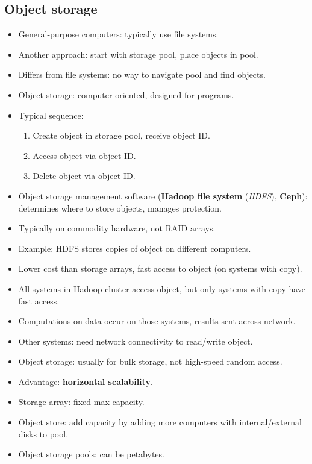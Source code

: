 \subsection{Object storage}
\begin{itemize}
    \item General-purpose computers: typically use file systems.
    \item Another approach: start with storage pool, place objects in pool.
    \item Differs from file systems: no way to navigate pool and find objects.
    \item Object storage: computer-oriented, designed for programs.
    \item Typical sequence:
    \begin{enumerate}
        \item Create object in storage pool, receive object ID.
        \item Access object via object ID.
        \item Delete object via object ID.
    \end{enumerate}
    \item Object storage management software (\textbf{Hadoop file system} (\textit{HDFS}), \textbf{Ceph}): determines where to store objects, manages protection.
    \item Typically on commodity hardware, not RAID arrays.
    \item Example: HDFS stores copies of object on different computers.
    \item Lower cost than storage arrays, fast access to object (on systems with copy).
    \item All systems in Hadoop cluster access object, but only systems with copy have fast access.
    \item Computations on data occur on those systems, results sent across network.
    \item Other systems: need network connectivity to read/write object.
    \item Object storage: usually for bulk storage, not high-speed random access.
    \item Advantage: \textbf{horizontal scalability}.
    \item Storage array: fixed max capacity.
    \item Object store: add capacity by adding more computers with internal/external disks to pool.
    \item Object storage pools: can be petabytes.

\end{itemize}
